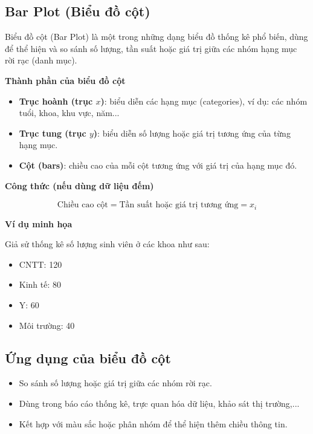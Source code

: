 \subsection{Bar Plot (Biểu đồ cột)}
\label{graph:bar}


Biểu đồ cột (Bar Plot) là một trong những dạng biểu đồ thống kê phổ biến, dùng để thể hiện và so sánh số lượng, tần suất hoặc giá trị giữa các nhóm hạng mục rời rạc (danh mục).

\textbf{Thành phần của biểu đồ cột}

\begin{itemize}
    \item \textbf{Trục hoành (trục $x$)}: biểu diễn các hạng mục (categories), ví dụ: các nhóm tuổi, khoa, khu vực, năm...
    \item \textbf{Trục tung (trục $y$)}: biểu diễn số lượng hoặc giá trị tương ứng của từng hạng mục.
    \item \textbf{Cột (bars)}: chiều cao của mỗi cột tương ứng với giá trị của hạng mục đó.
\end{itemize}

\textbf{Công thức (nếu dùng dữ liệu đếm)}

\[
\text{Chiều cao cột} = \text{Tần suất hoặc giá trị tương ứng} = x_i
\]

\textbf{Ví dụ minh họa}

Giả sử thống kê số lượng sinh viên ở các khoa như sau:

\begin{itemize}
    \item CNTT: 120
    \item Kinh tế: 80
    \item Y: 60
    \item Môi trường: 40
\end{itemize}

\subsection*{Ứng dụng của biểu đồ cột}

\begin{itemize}
    \item So sánh số lượng hoặc giá trị giữa các nhóm rời rạc.
    \item Dùng trong báo cáo thống kê, trực quan hóa dữ liệu, khảo sát thị trường,...
    \item Kết hợp với màu sắc hoặc phân nhóm để thể hiện thêm chiều thông tin.
\end{itemize}

